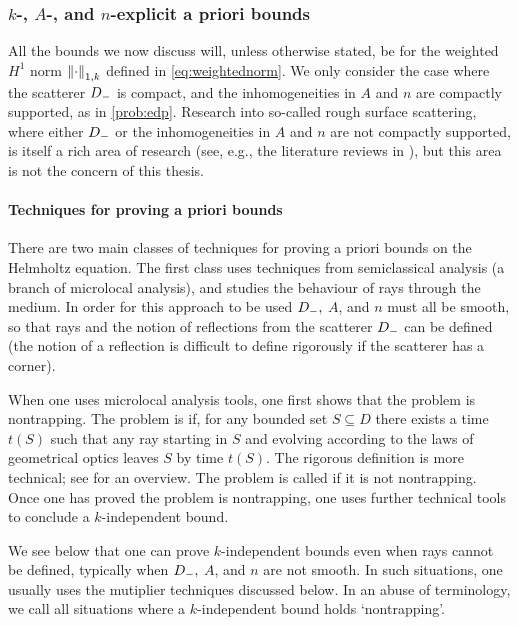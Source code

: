 \subsubsection{$k$-, $A$-, and $n$-explicit a priori bounds}
 All the bounds we now discuss will, unless otherwise stated, be for the weighted $H^1$ norm $\NW{\cdot}$ defined in \cref{eq:weightednorm}. We  only consider the case where the scatterer $D_{-}$ is compact, and the inhomogeneities in $A$ and $n$ are compactly supported, as in \cref{prob:edp}. Research into so-called rough surface scattering, where either $D_{-}$ or the inhomogeneities in $A$ and $n$ are not compactly supported, is itself a rich area of research (see, e.g., the literature reviews in \cite{Th:06}), but this area is not the concern of this thesis.


\paragraph{Techniques for proving a priori bounds} There are two main classes of techniques for proving a priori bounds on the Helmholtz equation. The first class uses techniques from semiclassical analysis (a branch of microlocal analysis), and studies the behaviour of rays through the medium. In order for this approach to be used $D_{-},$ $A$, and $n$ must all be smooth, so that rays and the notion of reflections from the scatterer $D_{-}$ can be defined (the notion of a reflection is difficult to define rigorously if the scatterer has a corner). 

When one uses microlocal analysis tools, one first shows that the problem is nontrapping. The problem is  if, for any bounded set $S \subseteq D$ there exists a time $t(S)$ such that any ray starting in $S$ and evolving according to the laws of geometrical optics leaves $S$ by time $t(S)$. The rigorous definition is more technical; see \cite[Section 6]{GrPeSp:19} for an overview. The problem is called  if it is not nontrapping. Once one has proved the problem is nontrapping, one uses further technical tools to conclude a $k$-independent bound.


We see below that one can prove $k$-independent bounds even when rays cannot be defined, typically when $D_{-},$ $A$, and $n$ are not smooth. In such situations, one usually uses the mutiplier techniques discussed below. In an abuse of terminology, we call all situations where a $k$-independent bound holds `nontrapping'.


